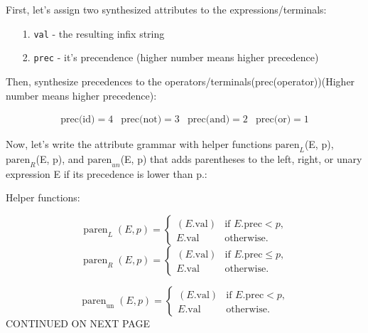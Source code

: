 \documentclass[11pt]{amsart}
\begin{document}
\begin{itemize}
\vspace{0.1in}

First, let's assign two synthesized attributes to the expressions/terminals:

\vspace{0.1in}

\begin{itemize}
     \item[1.] \texttt{val} - the resulting infix string
     \item[2.] \texttt{prec} - it's precendence (higher number means higher precedence)
\end{itemize}

\vspace{0.1in}

Then, synthesize precedences to the operators/terminals(\small{prec(operator)})(Higher number means higher precedence):

\vspace{-.09in}

\[
\begin{array}{cccc}
\text{prec(id)} = 4 & \text{prec(not)} = 3 & \text{prec(and)} = 2 & \text{prec(or)} = 1
\end{array}
\]

\vspace{0.1in}

Now, let's write the attribute grammar with helper functions $\text{paren}_L$(E, p), $\text{paren}_R$(E, p), and $\text{paren}_{un}$(E, p) that adds parentheses to the left, right, or unary expression E if its precedence is lower than p.:

\vspace{0.1in}

Helper functions:

\[
\operatorname{paren}_L(E,p)=
\begin{cases}
( E.\mathrm{val} ) & \text{if } E.\mathrm{prec} < p, \\
E.\mathrm{val}    & \text{otherwise.}
\end{cases}
\]
\[
\operatorname{paren}_R(E,p)=
\begin{cases}
( E.\mathrm{val} ) & \text{if } E.\mathrm{prec} \le p, \\
E.\mathrm{val}     & \text{otherwise.}
\end{cases}
\]

\[
\operatorname{paren}_{\mathrm{un}}(E,p)=
\begin{cases}
( E.\mathrm{val} ) & \text{if } E.\mathrm{prec} < p, \\
E.\mathrm{val}     & \text{otherwise.}
\end{cases}
\]
CONTINUED ON NEXT PAGE


\end{itemize}
\end{document}

